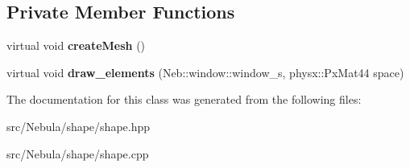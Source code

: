 \subsection*{\-Private \-Member \-Functions}
\begin{DoxyCompactItemize}
\item 
\hypertarget{classNeb_1_1Shape_1_1Empty_1_1Empty_ad5b111de596e1ab628ede4e3e01dac32}{virtual void {\bfseries create\-Mesh} ()}\label{classNeb_1_1Shape_1_1Empty_1_1Empty_ad5b111de596e1ab628ede4e3e01dac32}

\item 
\hypertarget{classNeb_1_1Shape_1_1Empty_1_1Empty_ab85a4fa75f0a4b63fd892c42f39e0f32}{virtual void {\bfseries draw\-\_\-elements} (\-Neb\-::window\-::window\-\_\-s, physx\-::\-Px\-Mat44 space)}\label{classNeb_1_1Shape_1_1Empty_1_1Empty_ab85a4fa75f0a4b63fd892c42f39e0f32}

\end{DoxyCompactItemize}


\-The documentation for this class was generated from the following files\-:\begin{DoxyCompactItemize}
\item 
src/\-Nebula/shape/shape.\-hpp\item 
src/\-Nebula/shape/shape.\-cpp\end{DoxyCompactItemize}
